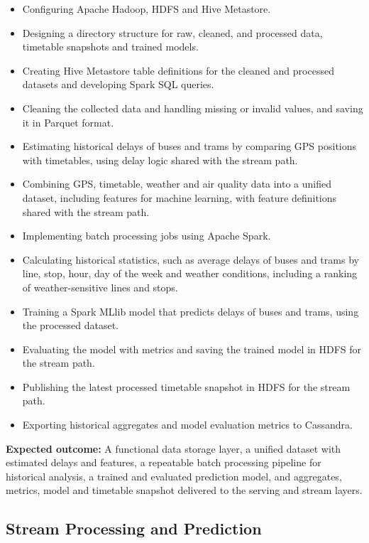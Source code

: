 \documentclass[11pt]{article}
\begin{document}
\begin{itemize}
    \item Configuring Apache Hadoop, HDFS and Hive Metastore.
    \item Designing a directory structure for raw, cleaned, and processed data, timetable snapshots and trained models.
    \item Creating Hive Metastore table definitions for the cleaned and processed datasets and developing Spark SQL queries.
    \item Cleaning the collected data and handling missing or invalid values, and saving it in Parquet format.
    \item Estimating historical delays of buses and trams by comparing GPS positions with timetables, using delay logic shared with the stream path.
    \item Combining GPS, timetable, weather and air quality data into a unified dataset, including features for machine learning, with feature definitions shared with the stream path.
    \item Implementing batch processing jobs using Apache Spark.
    \item Calculating historical statistics, such as average delays of buses and trams by line, stop, hour, day of the week and weather conditions, including a ranking of weather-sensitive lines and stops.
    \item Training a Spark MLlib model that predicts delays of buses and trams, using the processed dataset.
    \item Evaluating the model with metrics and saving the trained model in HDFS for the stream path.
    \item Publishing the latest processed timetable snapshot in HDFS for the stream path.
    \item Exporting historical aggregates and model evaluation metrics to Cassandra.
\end{itemize}
\textbf{Expected outcome:} A functional data storage layer, a unified dataset with estimated delays and features, a repeatable batch processing pipeline for historical analysis, a trained and evaluated prediction model, and aggregates, metrics, model and timetable snapshot delivered to the serving and stream layers.

\subsection{Stream Processing and Prediction}
\end{document}

